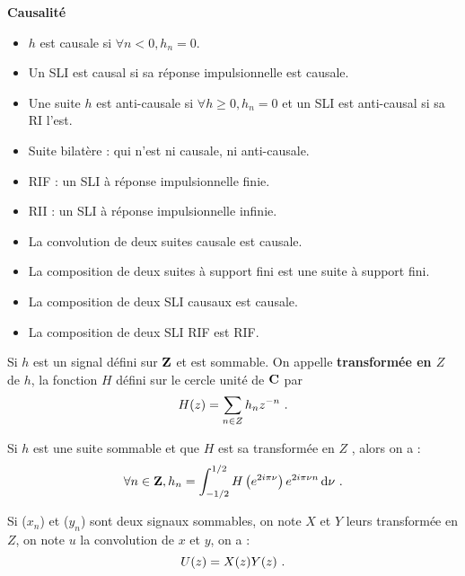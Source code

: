 \begin{voc}
	\textbf{Causalité}
	\begin{itemize}
	\item $h$ est causale si $\forall n<0, h_{n}=0$.
	\item Un SLI est causal si sa réponse impulsionnelle est causale.
	\item Une suite $h$ est anti-causale si $\forall h \geq 0, h_n = 0$ et un SLI est anti-causal si sa RI l'est.
	\item Suite bilatère : qui n'est ni causale, ni anti-causale.
	\item RIF : un SLI à réponse impulsionnelle finie.
	\item RII : un SLI à réponse impulsionnelle infinie.
	\end{itemize}
\end{voc}

\begin{pop}
	\begin{itemize}
	\item La convolution de deux suites causale est causale.
	\item La composition de deux suites à support fini est une suite à support fini.
	\item La composition de deux SLI causaux est causale.
	\item La composition de deux SLI RIF est RIF.
	\end{itemize}
\end{pop}

\begin{defn}
	Si $h$ est un signal défini sur $\mathbf{Z}$ et est sommable. On appelle \textbf{transformée en $Z$} de $h$, la fonction $H$ défini sur le cercle unité de $\mathbf{C}$ par
	\vspace{-0.15cm}$$
	H(z) = \sum_{n\in Z} h_{n}z^{-n}\ .
	\vspace{-0.15cm}$$
\end{defn}

\begin{pop}
	Si $h$ est une suite sommable et que $H$ est sa transformée en $Z$ , alors on a :
	\vspace{-0.15cm}$$
	\forall n \in \Z, h_{n}= \int_{-1/2}^{1/2} H \left( e^{2i\pi \nu} \right) e^{2i\pi \nu n} \diff \nu\ .
	\vspace{-0.15cm}$$
\end{pop}

\begin{pop}
	Si ($x_{n}$) et ($y_{n}$) sont deux signaux sommables, on note $X$ et $Y$ leurs transformée en $Z$, on note $u$ la convolution de $x$ et $y$, on a :
	\vspace{-0.15cm}$$
	U(z)=X(z)Y(z)\ .
	\vspace{-0.15cm}$$
\end{pop}

